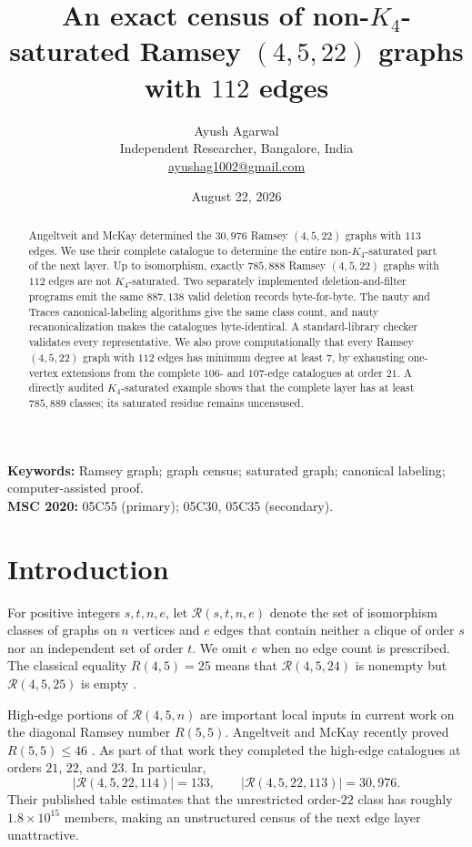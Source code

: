 \documentclass[10pt]{article}
\title{An exact census of non-$K_4$-saturated Ramsey $(4,5,22)$ graphs with $112$ edges}
\author{Ayush Agarwal\\[2pt]
\small Independent Researcher, Bangalore, India\\
\small \href{mailto:ayushag1002@gmail.com}{ayushag1002@gmail.com}}
\date{August 22, 2026}
\theoremstyle{definition}
\theoremstyle{remark}
\newcommand{\Rcal}{\mathcal{R}}
\begin{document}
\maketitle

\begin{abstract}
Angeltveit and McKay determined the $30{,}976$ Ramsey $(4,5,22)$ graphs
with $113$ edges.  We use their complete catalogue to determine the entire
non-$K_4$-saturated part of the next layer.  Up to isomorphism, exactly
$785{,}888$ Ramsey $(4,5,22)$ graphs with $112$ edges are not
$K_4$-saturated.  Two separately implemented deletion-and-filter programs
emit the same $887{,}138$ valid deletion records byte-for-byte.
The nauty and Traces canonical-labeling algorithms give the same class count,
and nauty recanonicalization makes the catalogues byte-identical.  A
standard-library checker validates every representative.  We also prove
computationally that every Ramsey $(4,5,22)$ graph with $112$ edges has
minimum degree at least $7$, by exhausting one-vertex extensions from the
complete $106$- and $107$-edge catalogues at order $21$.  A directly audited
$K_4$-saturated example shows that the complete layer has at least
$785{,}889$ classes; its saturated residue remains uncensused.
\end{abstract}

\noindent\textbf{Keywords:} Ramsey graph; graph census; saturated graph;
canonical labeling; computer-assisted proof.\\
\textbf{MSC 2020:} 05C55 (primary); 05C30, 05C35 (secondary).

\section{Introduction}

For positive integers $s,t,n,e$, let $\Rcal(s,t,n,e)$ denote the set of
isomorphism classes of graphs on $n$ vertices and $e$ edges that contain
neither a clique of order $s$ nor an independent set of order $t$.  We omit
$e$ when no edge count is prescribed.  The classical equality
$R(4,5)=25$ means that $\Rcal(4,5,24)$ is nonempty but
$\Rcal(4,5,25)$ is empty \cite{mckay-radziszowski-1995}.

High-edge portions of $\Rcal(4,5,n)$ are important local inputs in current
work on the diagonal Ramsey number $R(5,5)$.  Angeltveit and McKay recently
proved $R(5,5)\leq 46$ \cite{angeltveit-mckay-2026}.  As part of that work
they completed the high-edge catalogues at orders $21$, $22$, and $23$.
In particular,
\[
 |\Rcal(4,5,22,114)|=133,
 \qquad
 |\Rcal(4,5,22,113)|=30{,}976.
\]
Their published table estimates that the unrestricted order-$22$ class has
roughly $1.8\times 10^{15}$ members, making an unstructured census of the
next edge layer unattractive.
\end{document}
